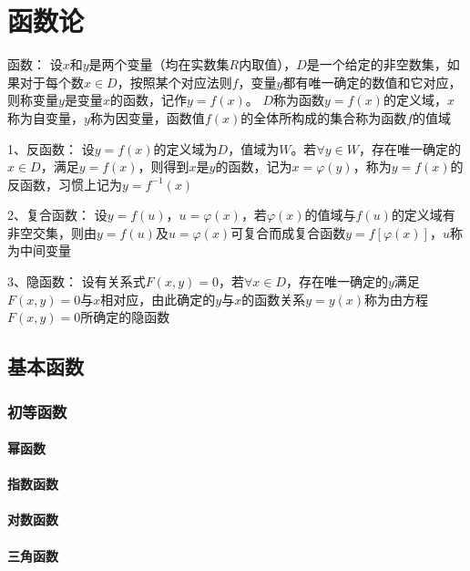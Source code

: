 \documentclass[12pt]{book}
\begin{document}
\chapter{函数论}

函数：
设$x$和$y$是两个变量（均在实数集$R$内取值），$D$是一个给定的非空数集，如果对于每个数$x\in D$，按照某个对应法则$f$，变量$y$都有唯一确定的数值和它对应，则称变量$y$是变量$x$的函数，记作$y= f(x)$。
$D$称为函数$y= f(x)$的定义域，$x$称为自变量，$y$称为因变量，函数值$ f(x)$的全体所构成的集合称为函数$f$的值域

1、反函数：
设$y= f(x)$的定义域为$D$，值域为$W$。若$\forall y \in W$，存在唯一确定的$x \in D$，满足$y= f(x)$，则得到$x$是$y$的函数，记为$ x =\varphi(y)$，称为$y= f(x)$的反函数，习惯上记为$ y= f^{-1}(x)$

2、复合函数：
设$ y = f(u)$，$u=\varphi(x)$，若$\varphi(x)$的值域与$f(u)$的定义域有非空交集，则由$ y = f(u)$及$u=\varphi(x)$可复合而成复合函数$ y = f[\varphi(x)]$，$u$称为中间变量

3、隐函数：
设有关系式$ F(x,y)=0$，若$\forall x\in D$，存在唯一确定的$y$满足$F(x,y)= 0$与$x$相对应，由此确定的$y$与$ x $的函数关系$y = y(x)$称为由方程$  F(x,y)= 0  $所确定的隐函数


\section{基本函数}

\subsection{初等函数}





\subsubsection{幂函数}




\subsubsection{指数函数}



\subsubsection{对数函数}



\subsubsection{三角函数}
\end{document}
